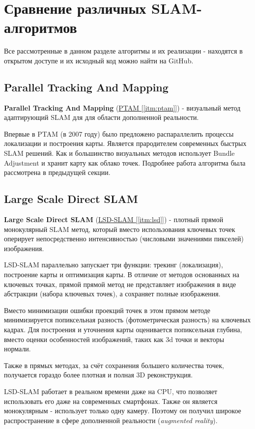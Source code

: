 \section{Сравнение различных SLAM-алгоритмов}

Все рассмотренные в данном разделе алгоритмы и их реализации - находятся в открытом доступе и их исходный код можно найти на GitHub.

\subsection{Parallel Tracking And Mapping}
\textbf{Parallel Tracking And Mapping} (\hyperref[itm:ptam]{PTAM [\ref{itm:ptam}]}) - визуальный метод адаптирующий SLAM для для области дополненной реальности.

Впервые в PTAM (в 2007 году) было предложено распараллелить процессы локализации и построения карты. Является прародителем современных быстрых SLAM решений. Как и большинство визуальных методов использует Bundle Adjustment и хранит карту как облако точек. Подробнее работа алгоритма была рассмотрена в предыдущей секции.

\subsection{Large Scale Direct SLAM}
\textbf{Large Scale Direct SLAM} (\hyperref[itm:lsd]{LSD-SLAM [\ref{itm:lsd}]}) - плотный прямой монокулярный SLAM метод, который вместо использования ключевых точек оперирует непосредственно интенсивностью (числовыми значениями пикселей) изображения.

LSD-SLAM параллельно запускает три функции: трекинг (локализация), построение карты и оптимизация карты. В отличие от методов основанных на ключевых точках, прямой прямой метод не представляет изображения в виде абстракции (набора ключевых точек), а сохраняет полные изображения.

Вместо минимизации ошибки проекций точек в этом прямом методе минимизируется попиксельная разность (фотометрическая разность) на ключевых кадрах. Для построения и уточнения карты оценивается попиксельная глубина, вместо оценки особенностей изображений, таких как 3d точки и векторы нормали.

Также в прямых методах, за счёт сохранения большего количества точек, получается гораздо более плотная и полная 3D реконструкция.

LSD-SLAM работает в реальном времени даже на CPU, что позволяет использовать его даже на современных смартфонах. Также он является монокулярным - использует только одну камеру. Поэтому он получил широкое распространение в сфере дополненной реальности (\textit{augmented reality}).

